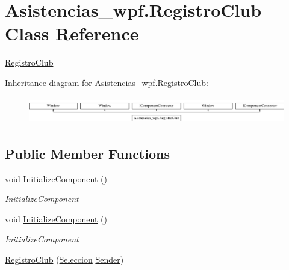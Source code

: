 \hypertarget{class_asistencias__wpf_1_1_registro_club}{\section{Asistencias\-\_\-wpf.\-Registro\-Club Class Reference}
\label{class_asistencias__wpf_1_1_registro_club}
}


\hyperlink{class_asistencias__wpf_1_1_registro_club}{Registro\-Club}  


Inheritance diagram for Asistencias\-\_\-wpf.\-Registro\-Club\-:\begin{figure}[H]
\begin{center}
\leavevmode
\includegraphics[height=1.197861cm]{db/d38/class_asistencias__wpf_1_1_registro_club}
\end{center}
\end{figure}
\subsection*{Public Member Functions}
\begin{DoxyCompactItemize}
\item 
void \hyperlink{class_asistencias__wpf_1_1_registro_club_a2b67cb1abca561248996e7024a682cf9}{Initialize\-Component} ()
\begin{DoxyCompactList}\small\item\em Initialize\-Component \end{DoxyCompactList}\item 
void \hyperlink{class_asistencias__wpf_1_1_registro_club_a2b67cb1abca561248996e7024a682cf9}{Initialize\-Component} ()
\begin{DoxyCompactList}\small\item\em Initialize\-Component \end{DoxyCompactList}\item 
\hyperlink{class_asistencias__wpf_1_1_registro_club_aec16d19fce703aecff6bc10b81157ab5}{Registro\-Club} (\hyperlink{class_asistencias__wpf_1_1_seleccion}{Seleccion} \hyperlink{class_asistencias__wpf_1_1_registro_club_ac048d137bde3fd429180c98f34d784eb}{Sender})
\end{DoxyCompactItemize}
